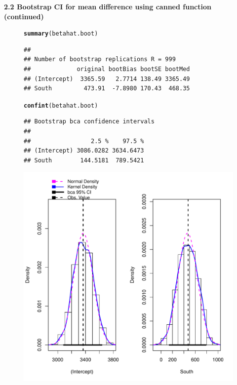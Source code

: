 \documentclass[10pt]{beamer}\usepackage[]{graphicx}\usepackage[]{color}
\makeatletter
\def\maxwidth{ %
  \ifdim\Gin@nat@width>\linewidth
    \linewidth
  \else
    \Gin@nat@width
  \fi
}
\newcommand{\hlstd}[1]{\textcolor[rgb]{0.345,0.345,0.345}{#1}}%
\newcommand{\hlkwd}[1]{\textcolor[rgb]{0.737,0.353,0.396}{\textbf{#1}}}%
\newenvironment{kframe}{%
 \def\at@end@of@kframe{}%
 \ifinner\ifhmode%
  \def\at@end@of@kframe{\end{minipage}}%
  \begin{minipage}{\columnwidth}%
 \fi\fi%
 \def\FrameCommand##1{\hskip\@totalleftmargin \hskip-\fboxsep
 \colorbox{shadecolor}{##1}\hskip-\fboxsep
     \hskip-\linewidth \hskip-\@totalleftmargin \hskip\columnwidth}%
 \MakeFramed {\advance\hsize-\width
   \@totalleftmargin\z@ \linewidth\hsize
   \@setminipage}}%
 {\par\unskip\endMakeFramed%
 \at@end@of@kframe}
\newenvironment{knitrout}{}{} %
\makeatother
\begin{document}
\begin{frame}[fragile,plain]
	\small
	\textbf{2.2 Bootstrap CI for mean difference using canned function (continued)}

		\begin{figure}
		\begin{minipage}[h]{0.45\linewidth}
\begin{knitrout}\tiny
{}\color{fgcolor}\begin{kframe}
\begin{alltt}
\hlkwd{summary}\hlstd{(betahat.boot)}
\end{alltt}
\begin{verbatim}
## 
## Number of bootstrap replications R = 999 
##             original bootBias bootSE bootMed
## (Intercept)  3365.59   2.7714 138.49 3365.49
## South         473.91  -7.8980 170.43  468.35
\end{verbatim}
\begin{alltt}
\hlkwd{confint}\hlstd{(betahat.boot)}
\end{alltt}
\begin{verbatim}
## Bootstrap bca confidence intervals
## 
##                 2.5 %    97.5 %
## (Intercept) 3086.0282 3634.6473
## South        144.5181  789.5421
\end{verbatim}
\end{kframe}
\end{knitrout}
			
		\end{minipage}
		\hspace{0.4cm}
		\begin{minipage}[h]{0.50\linewidth}
\begin{knitrout}\tiny
{}\color{fgcolor}

{\centering \includegraphics[width=\maxwidth]{figure/unnamed-chunk-11-1} 

}
\end{knitrout}
\end{minipage}
\end{figure}
\end{frame}
\end{document}
